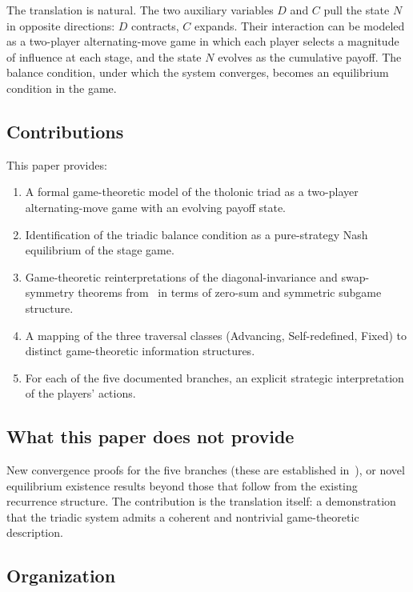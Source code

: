 \documentclass[12pt]{article}
\theoremstyle{definition}
\theoremstyle{remark}
\begin{document}
The translation is natural.  The two auxiliary variables $D$ and $C$ pull the state
$N$ in opposite directions: $D$ contracts, $C$ expands.  Their interaction can be
modeled as a two-player alternating-move game in which each player selects a magnitude
of influence at each stage, and the state $N$ evolves as the cumulative payoff.  The
balance condition, under which the system converges, becomes an equilibrium condition
in the game.

\subsection*{Contributions}

This paper provides:
\begin{enumerate}
\item A formal game-theoretic model of the tholonic triad as a two-player
      alternating-move game with an evolving payoff state.
\item Identification of the triadic balance condition as a pure-strategy Nash
      equilibrium of the stage game.
\item Game-theoretic reinterpretations of the diagonal-invariance and swap-symmetry
      theorems from~\cite{Mil26a} in terms of zero-sum and symmetric subgame structure.
\item A mapping of the three traversal classes (Advancing, Self-redefined, Fixed)
      to distinct game-theoretic information structures.
\item For each of the five documented branches, an explicit strategic interpretation
      of the players' actions.
\end{enumerate}

\subsection*{What this paper does not provide}

New convergence proofs for the five branches (these are established in~\cite{Mil26a}),
or novel equilibrium existence results beyond those that follow from the existing
recurrence structure.  The contribution is the translation itself: a demonstration that
the triadic system admits a coherent and nontrivial game-theoretic description.

\subsection*{Organization}
\end{document}
